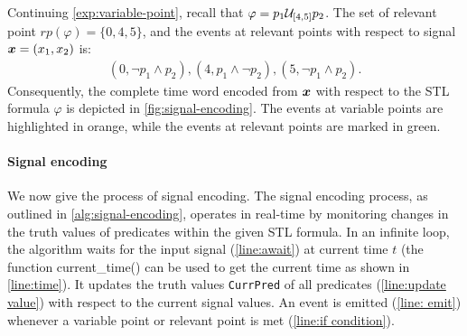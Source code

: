            \begin{example}\label{exp:relavant-point}
                Continuing \cref{exp:variable-point}, recall that $\varphi=p_1\until_{[4,5]}p_2$. The set of relevant point $rp(\varphi)=\{0,4,5\}$, and the events at relevant points with respect to signal $\bm{x}=(x_1,x_2)$ is:
                \begin{align*}
                    (0,\neg p_1\land p_2),(4, p_1\land \neg p_2),(5,\neg p_1\land p_2).
                \end{align*}
                Consequently, the complete time word encoded from $\bm{x}$ with respect to the STL formula $\varphi$ is depicted in \cref{fig:signal-encoding}. The events at variable points are highlighted in orange, while the events at relevant points are marked in green.
                \qedT
            \end{example}

        \paragraph{Signal encoding} We now give the process of signal encoding. 
        The signal encoding process, as outlined in \cref{alg:signal-encoding}, operates in real-time by monitoring changes in the truth values of predicates within the given STL formula. In an infinite loop, the algorithm waits for the input signal (\cref{line:await}) at current time $t$ (the function \textsf{current\_time()} can be used to get the current time as shown in \cref{line:time}). It updates the truth values \texttt{CurrPred} of all predicates (\cref{line:update value}) with respect to the current signal values. An event is emitted (\cref{line: emit}) whenever a variable point or relevant point is met (\cref{line:if condition}). 


